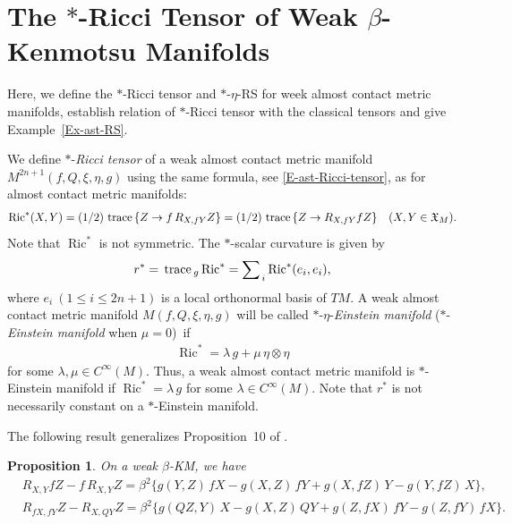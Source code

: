 \documentclass[11pt,a4paper,twoside]{article}
\newtheorem{proposition}{Proposition}%
\def\Ric{\operatorname{Ric}}
\def\tr{{\rm\,trace\,}}
\begin{document}
{\section{The $\ast$-Ricci Tensor of Weak $\beta$-Kenmotsu Manifolds}
\label{sec:03}

Here, we define the $\ast$-Ricci tensor and $\ast$-$\eta$-{RS} for week almost contact metric mani\-folds,
establish relation of $\ast$-Ricci tensor with the classical tensors and give Example~\ref{Ex-ast-RS}.

We define $\ast$-{\em Ricci tensor} of a weak almost contact metric manifold $M^{2n+1}(f,Q,\xi,\eta,g)$ using the same formula, see \eqref{E-ast-Ricci-tensor}, as for almost contact metric manifolds:
\begin{align*}
 \Ric^\ast(X,Y)
 =(1/2)\,\tr\{Z\to f\,R_{X, fY} Z\}
 = (1/2)\,\tr\{Z\to R_{X, fY} fZ\}
  \quad (X,Y\in\mathfrak{X}_M).
\end{align*}
Note that $\Ric^\ast$ is not symmetric.
The $\ast$-scalar curvature is given by
\[
{r}^\ast=\tr_{g}\Ric^\ast=\sum\nolimits_{\,i}\Ric^\ast(e_i,e_i),
\]
where $e_i\ (1\le i\le 2n+1)$ is a local orthonormal basis of $TM$.
A weak almost contact metric manifold $M(f,Q,\xi,\eta,g)$
will be called $\ast$-$\eta$-{\em Einstein manifold} ($\ast$-{\em Einstein manifold} when $\mu=0$)~if
\begin{align}\label{E-ast-Einstein}
 \Ric^\ast = \lambda\,g + \mu\,\eta\otimes\eta
\end{align}
for some $\lambda,\mu\in C^\infty(M)$.
Thus, a weak almost contact metric manifold is $\ast$-Einstein  manifold if
$\Ric^\ast = \lambda\,g$ for some $\lambda\in C^\infty(M)$.
Note that ${r}^\ast$ is not necessarily constant on a $\ast$-Einstein manifold.

The following result generalizes Proposition~10 of \cite{kenmotsu1972class}.

\begin{proposition}
 On a weak $\beta$-KM, we have
\begin{align}\label{E-lem2-1}
 & R_{X,Y}fZ - f\,R_{X,Y}Z = \beta^2\{
 g(Y,Z)\,fX - g(X,Z)\,fY + g(X,fZ)\,Y - g(Y,fZ)\,X \} ,\\
 \label{E-lem2-2}
 & R_{fX,fY}Z - R_{X,QY}Z = \beta^2\{
 g(QZ,Y)\,X - g(X,Z)\,QY + g(Z,fX)\,fY - g(Z,fY)\,fX \}.
\end{align}
\end{proposition}

}
\end{document}
